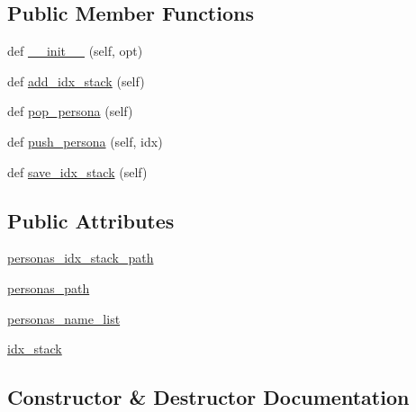 \subsection*{Public Member Functions}
\begin{DoxyCompactItemize}
\item 
def \hyperlink{classpersonachat__eval_1_1worlds_1_1PersonasGenerator_a1040c1f204e103d16f0a8137c1dec671}{\+\_\+\+\_\+init\+\_\+\+\_\+} (self, opt)
\item 
def \hyperlink{classpersonachat__eval_1_1worlds_1_1PersonasGenerator_a3ee1d0c2545efba647539933d1d649d0}{add\+\_\+idx\+\_\+stack} (self)
\item 
def \hyperlink{classpersonachat__eval_1_1worlds_1_1PersonasGenerator_ac73e52e318d64155bf0812768f0e3fa3}{pop\+\_\+persona} (self)
\item 
def \hyperlink{classpersonachat__eval_1_1worlds_1_1PersonasGenerator_add94526a589a3e01f2843f88e31b754e}{push\+\_\+persona} (self, idx)
\item 
def \hyperlink{classpersonachat__eval_1_1worlds_1_1PersonasGenerator_ae6b7fbf4c1ec66c73f69de4df0357447}{save\+\_\+idx\+\_\+stack} (self)
\end{DoxyCompactItemize}
\subsection*{Public Attributes}
\begin{DoxyCompactItemize}
\item 
\hyperlink{classpersonachat__eval_1_1worlds_1_1PersonasGenerator_a9f5f33e98c5ca888b345a0adfb799fe7}{personas\+\_\+idx\+\_\+stack\+\_\+path}
\item 
\hyperlink{classpersonachat__eval_1_1worlds_1_1PersonasGenerator_a8d78d1748f246ca5a3313dd0719772b2}{personas\+\_\+path}
\item 
\hyperlink{classpersonachat__eval_1_1worlds_1_1PersonasGenerator_a93f6fd5e10e1fadb6f4494d223978992}{personas\+\_\+name\+\_\+list}
\item 
\hyperlink{classpersonachat__eval_1_1worlds_1_1PersonasGenerator_a0065bfc8c429bc99b4c180315a2a33dd}{idx\+\_\+stack}
\end{DoxyCompactItemize}


\subsection{Constructor \& Destructor Documentation}
\mbox{\label{classpersonachat__eval_1_1worlds_1_1PersonasGenerator_a1040c1f204e103d16f0a8137c1dec671}} 
